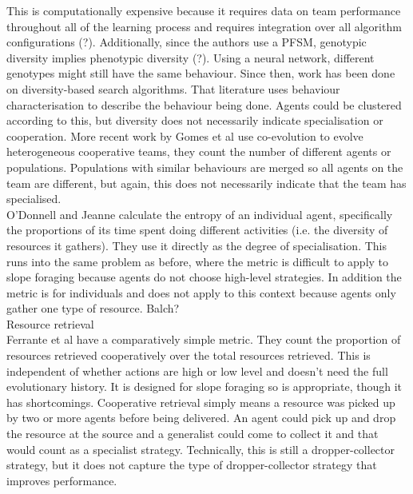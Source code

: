 \documentclass[12pt]{article}
\begin{document}
This is computationally expensive because it requires data on team performance throughout all of the learning process and requires integration over all algorithm configurations (?). Additionally, since the authors use a PFSM, genotypic diversity implies phenotypic diversity (?). Using a neural network, different genotypes might still have the same behaviour. Since then, work has been done on diversity-based search algorithms. That literature uses behaviour characterisation to describe the behaviour being done. Agents could be clustered according to this, but diversity does not necessarily indicate specialisation or cooperation. More recent work by Gomes et al \cite{gomes:IEEETR:2017} use co-evolution to evolve heterogeneous cooperative teams, they count the number of different agents or populations. Populations with similar behaviours are merged so all agents on the team are different, but again, this does not necessarily indicate that the team has specialised.  \\

O'Donnell and Jeanne \cite{odonnell:BES:1990} calculate the entropy of an individual agent, specifically the proportions of its time spent doing different activities (i.e. the diversity of resources it gathers). They use it directly as the degree of specialisation. This runs into the same problem as before, where the metric is difficult to apply to slope foraging because agents do not choose high-level strategies. In addition the metric is for individuals and does not apply to this context because agents only gather one type of resource. Balch?\\

Resource retrieval\\

Ferrante et al \cite{ferrante:PLoSCB:2015} have a comparatively simple metric. They count the proportion of resources retrieved cooperatively over the total resources retrieved. This is independent of whether actions are high or low level and doesn't need the full evolutionary history. It is designed for slope foraging so is appropriate, though it has shortcomings.  Cooperative retrieval simply means a resource was picked up by two or more agents before being delivered. An agent could pick up and drop the resource at the source and a generalist could come to collect it and that would count as a specialist strategy. Technically, this is still a dropper-collector strategy, but it does not capture the type of dropper-collector strategy that improves performance.\\
\end{document}
